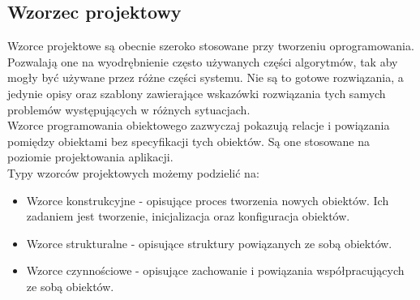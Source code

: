 \documentclass[12pt]{report}
\begin{document}
\subsection{Wzorzec projektowy}
	\indent Wzorce projektowe są obecnie szeroko stosowane przy tworzeniu oprogramowania. Pozwalają one na wyodrębnienie często używanych części algorytmów, tak aby mogły być używane przez różne części systemu. Nie są to gotowe rozwiązania, a jedynie opisy oraz szablony zawierające wskazówki rozwiązania tych samych problemów występujących w różnych sytuacjach. \\
	\indent Wzorce programowania obiektowego zazwyczaj pokazują relacje i powiązania pomiędzy obiektami bez specyfikacji tych obiektów. Są one stosowane na poziomie projektowania aplikacji. \\
	\indent Typy wzorców projektowych możemy podzielić na:
	\begin{itemize}
		\item{Wzorce konstrukcyjne - opisujące proces tworzenia nowych obiektów. Ich zadaniem jest tworzenie, inicjalizacja oraz konfiguracja obiektów.}
		\item{Wzorce strukturalne - opisujące struktury powiązanych ze sobą obiektów.}
		\item{Wzorce czynnościowe - opisujące zachowanie i powiązania współpracujących ze sobą obiektów.}
	 \end{itemize} 
\end{document}
